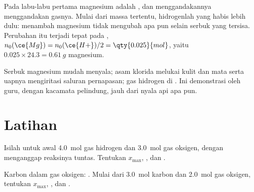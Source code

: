 \begin{remark}\label{rem:g10:reaction-progress-table:plateau}
Pada labu-labu pertama magnesium adalah , dan
menggandakannya menggandakan gasnya. Mulai dari massa tertentu, 
hidrogenlah yang habis lebih dulu: menambah magnesium tidak mengubah
apa pun selain serbuk yang tersisa. Perubahan itu terjadi tepat pada
, $n_0(\ce{Mg}) = n_0(\ce{H+})/2 = \qty{0.025}{mol}$,
yaitu $0.025 \times 24.3 = \qty{0.61}{g}$ magnesium.
\end{remark}

\begin{safety}{}
Serbuk magnesium mudah menyala; asam klorida melukai kulit dan mata
serta uapnya mengiritasi saluran pernapasan; gas hidrogen  di
. Ini demonstrasi oleh guru, dengan kacamata pelindung, jauh dari
nyala api apa pun.
\end{safety}

\section{Latihan}

\begin{exercise}[$\star$]\label{exo:g10:reaction-progress-table:1}
Isilah   untuk  awal
\qty{4.0}{mol} gas hidrogen dan \qty{3.0}{mol} gas oksigen, dengan
menganggap reaksinya tuntas. Tentukan $x_{\max}$, , dan
.
\end{exercise}

\begin{exercise}[$\star$]\label{exo:g10:reaction-progress-table:2}
Karbon  dalam gas oksigen: . Mulai dari
\qty{3.0}{mol} karbon dan \qty{2.0}{mol} gas oksigen, tentukan
$x_{\max}$, , dan .
\end{exercise}

